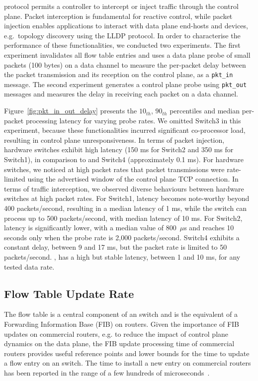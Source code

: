 \of protocol permits a controller to intercept or inject traffic through the
control plane. Packet interception is fundamental for reactive control, while
packet injection enables applications to interact with data plane end-hosts and
devices, e.g.~topology discovery using the LLDP protocol.  In order to
characterise the performance of these functionalities, we conducted two
experiments.  The first experiment invalidates all flow table entries and uses a
data plane probe of small packets (100 bytes) on a data channel to  measure the
per-packet delay between the packet transmission and its reception on the
control plane, as a \texttt{pkt\_in} message. The second experiment generates a
control plane probe using \texttt{pkt\_out} messages and measures the delay in
receiving each packet on a data channel.  

Figure~\ref{fig:pkt_in_out_delay} presents the $10_{th}$, $90_{th}$ percentiles and
median per-packet processing latency for varying probe rates. We omitted Switch3 in
this experiment, because these functionalities incurred significant co-processor
load, resulting in control plane unresponsiveness.  In terms of packet
injection, hardware switches exhibit high latency (150 ms for Switch2 and 350
ms for Switch1), in comparison to \ovs and Switch4 (approximately 0.1 ms).
For hardware switches, we noticed at high packet rates that packet
transmissions were rate-limited using the advertised window of the control plane
TCP connection. In terms of traffic interception, we observed diverse behaviours
between hardware switches at high packet rates. For Switch1, latency becomes
note-worthy beyond 400 packets/second, resulting in a median latency of 1 ms,
while the switch can process up to 500 packets/second, with median latency of 10
ms. For Switch2, latency is significantly lower, with a median value of
800~$\mu$s and reaches 10 seconds only when the probe rate is 2,000
packets/second. Switch4 exhibits a constant delay, between 9 and 17 ms, but the
packet rate is limited to 50 packets/second.  \ovs, has a high but stable latency,
between 1 and 10 ms, for any tested data rate. 

\subsection{Flow Table Update Rate}\label{sec:results-rate}

The flow table is a central component of an \of switch and is the equivalent of
a Forwarding Information Base (FIB) on routers. Given the importance of FIB
updates on commercial routers, e.g. to reduce the impact of control plane
dynamics on the data plane, the FIB update processing time of commercial routers
provides useful reference points and lower bounds for the time to update a flow
entry on an \of switch. The time to install a new entry on commercial routers
has been reported in the range of a few hundreds of
microseconds~.


